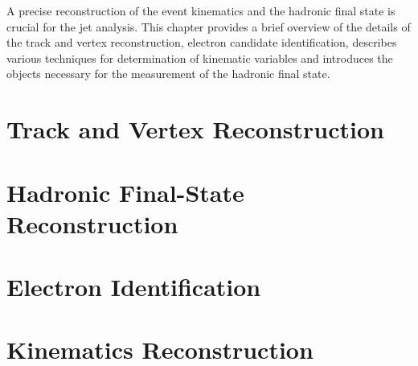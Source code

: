 A precise reconstruction of the event kinematics and the hadronic final state is crucial for the jet analysis. This chapter provides a brief overview of the details of the track and vertex reconstruction, electron candidate identification, describes various techniques for determination of kinematic variables and introduces the objects necessary for the measurement of the hadronic final state. 

\section{Track and Vertex Reconstruction}
\label{sec:trackvtxreco}


\section{Hadronic Final-State Reconstruction}
\label{sec:hadronreco}


\section{Electron Identification}
\label{sec:eleid}


\section{Kinematics Reconstruction}
\label{sec:kinrec}




